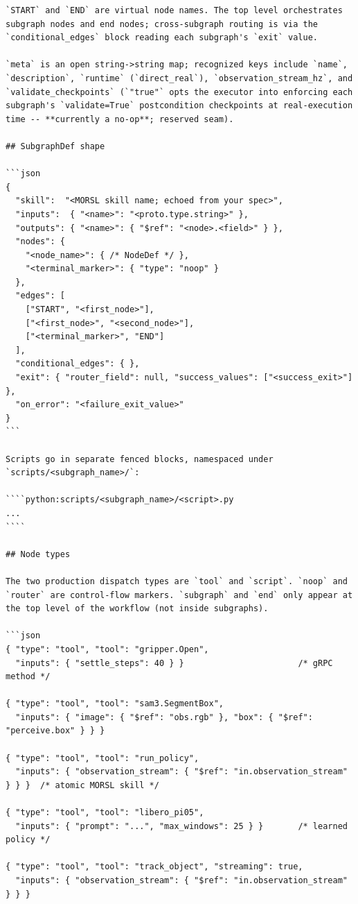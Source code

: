\begin{lstlisting}
`START` and `END` are virtual node names. The top level orchestrates
subgraph nodes and end nodes; cross-subgraph routing is via the
`conditional_edges` block reading each subgraph's `exit` value.

`meta` is an open string->string map; recognized keys include `name`,
`description`, `runtime` (`direct_real`), `observation_stream_hz`, and
`validate_checkpoints` (`"true"` opts the executor into enforcing each
subgraph's `validate=True` postcondition checkpoints at real-execution
time -- **currently a no-op**; reserved seam).

## SubgraphDef shape

```json
{
  "skill":  "<MORSL skill name; echoed from your spec>",
  "inputs":  { "<name>": "<proto.type.string>" },
  "outputs": { "<name>": { "$ref": "<node>.<field>" } },
  "nodes": {
    "<node_name>": { /* NodeDef */ },
    "<terminal_marker>": { "type": "noop" }
  },
  "edges": [
    ["START", "<first_node>"],
    ["<first_node>", "<second_node>"],
    ["<terminal_marker>", "END"]
  ],
  "conditional_edges": { },
  "exit": { "router_field": null, "success_values": ["<success_exit>"] },
  "on_error": "<failure_exit_value>"
}
```

Scripts go in separate fenced blocks, namespaced under
`scripts/<subgraph_name>/`:

````python:scripts/<subgraph_name>/<script>.py
...
````

## Node types

The two production dispatch types are `tool` and `script`. `noop` and
`router` are control-flow markers. `subgraph` and `end` only appear at
the top level of the workflow (not inside subgraphs).

```json
{ "type": "tool", "tool": "gripper.Open",
  "inputs": { "settle_steps": 40 } }                       /* gRPC method */

{ "type": "tool", "tool": "sam3.SegmentBox",
  "inputs": { "image": { "$ref": "obs.rgb" }, "box": { "$ref": "perceive.box" } } }

{ "type": "tool", "tool": "run_policy",
  "inputs": { "observation_stream": { "$ref": "in.observation_stream" } } }  /* atomic MORSL skill */

{ "type": "tool", "tool": "libero_pi05",
  "inputs": { "prompt": "...", "max_windows": 25 } }       /* learned policy */

{ "type": "tool", "tool": "track_object", "streaming": true,
  "inputs": { "observation_stream": { "$ref": "in.observation_stream" } } }


\end{lstlisting}
